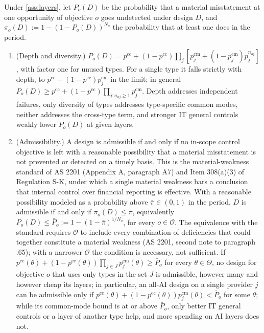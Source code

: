 \begin{proposition}\label{prop:amin}
Under \autoref{ass:layers}, let $P_o(D)$ be the probability that a material misstatement at one opportunity of objective $o$ goes undetected under design $D$, and $\pi_o(D):=1-(1-P_o(D))^{N_o}$ the probability that at least one does in the period.
\begin{enumerate}
\item[(a)] (Depth and diversity.) $P_o(D)=p^{\mathrm{cc}}+(1-p^{\mathrm{cc}})\prod_j[p^{\mathrm{cm}}_j+(1-p^{\mathrm{cm}}_j)p_j^{n_{oj}}]$, with factor one for unused types. For a single type it falls strictly with depth, to $p^{\mathrm{cc}}+(1-p^{\mathrm{cc}})p^{\mathrm{cm}}_j$ in the limit; in general $P_o(D)\ge p^{\mathrm{cc}}+(1-p^{\mathrm{cc}})\prod_{j:n_{oj}\ge1}p^{\mathrm{cm}}_j$. Depth addresses independent failures, only diversity of types addresses type-specific common modes, neither addresses the cross-type term, and stronger IT general controls weakly lower $P_o(D)$ at given layers.
\item[(b)] (Admissibility.) A design is admissible if and only if no in-scope control objective is left with a reasonable possibility that a material misstatement is not prevented or detected on a timely basis. This is the material-weakness standard of AS 2201 (Appendix A, paragraph A7) and Item 308(a)(3) of Regulation S-K, under which a single material weakness bars a conclusion that internal control over financial reporting is effective. With a reasonable possibility modeled as a probability above $\bar\pi\in(0,1)$ in the period, $D$ is admissible if and only if $\pi_o(D)\le\bar\pi$, equivalently $P_o(D)\le\bar P_o:=1-(1-\bar\pi)^{1/N_o}$, for every $o\in\mathcal O$. The equivalence with the standard requires $\mathcal O$ to include every combination of deficiencies that could together constitute a material weakness (AS 2201, second note to paragraph .65); with a narrower $\mathcal O$ the condition is necessary, not sufficient. If $p^{\mathrm{cc}}(\theta)+(1-p^{\mathrm{cc}}(\theta))\prod_{j\in J}p^{\mathrm{cm}}_j(\theta)\ge\bar P_o$ for every $\theta\in\Theta$, no design for objective $o$ that uses only types in the set $J$ is admissible, however many and however cheap its layers; in particular, an all-AI design on a single provider $j$ can be admissible only if $p^{\mathrm{cc}}(\theta)+(1-p^{\mathrm{cc}}(\theta))p^{\mathrm{cm}}_j(\theta)<\bar P_o$ for some $\theta$; while its common-mode bound is at or above $\bar P_o$, only better IT general controls or a layer of another type help, and more spending on AI layers does not.

\end{enumerate}
\end{proposition}
